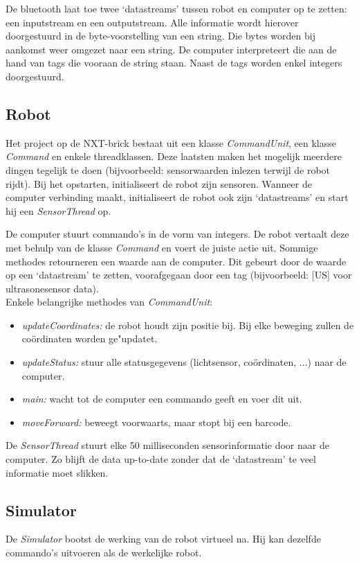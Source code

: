 \documentclass[t1]{penoverslag}
\begin{document}
De bluetooth laat toe twee `datastreams' tussen robot en computer op te zetten: een inputstream en een outputstream. Alle informatie wordt hierover doorgestuurd in de byte-voorstelling van een string. Die bytes worden bij aankomst weer omgezet naar een string. De computer interpreteert die aan de hand van tags die vooraan de string staan. Naast de tags worden enkel integers doorgestuurd.

\subsection{Robot} %
\label{ssec:robot}
Het project op de NXT-brick bestaat uit een klasse \textit{CommandUnit}, een klasse \textit{Command} en enkele threadklassen. Deze laatsten maken het mogelijk meerdere dingen tegelijk te doen (bijvoorbeeld: sensorwaarden inlezen terwijl de robot rijdt). Bij het opstarten, initialiseert de robot zijn sensoren. Wanneer de computer verbinding maakt, initialiseert de robot ook zijn `datastreams' en start hij een \textit{SensorThread} op.

De computer stuurt commando's in de vorm van integers. De robot vertaalt deze met behulp van de klasse \textit{Command} en voert de juiste actie uit. Sommige methodes retourneren een waarde aan de computer. Dit gebeurt door de waarde op een `datastream' te zetten, voorafgegaan door een tag (bijvoorbeeld: [US] voor ultrasonesensor data).\\

Enkele belangrijke methodes van \textit{CommandUnit}:
\begin{itemize}
\item \textit{updateCoordinates:} de robot houdt zijn positie bij. Bij elke beweging zullen de co\"ordinaten worden ge"updatet.
\item \textit{updateStatus:} stuur alle statusgegevens (lichtsensor, co\"ordinaten, ...) naar de computer.
\item \textit{main:} wacht tot de computer een commando geeft en voer dit uit.
\item \textit{moveForward:} beweegt voorwaarts, maar stopt bij een barcode.
\end{itemize}

De \textit{SensorThread} stuurt elke 50 milliseconden sensorinformatie door naar de computer. Zo blijft de data up-to-date zonder dat de `datastream' te veel informatie moet slikken.

\subsection{Simulator} %
\label{ssec:simulator}
De \textit{Simulator} bootst de werking van de robot virtueel na. Hij kan dezelfde commando's uitvoeren als de werkelijke robot.
\end{document}
